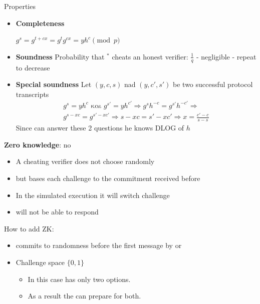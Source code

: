 \documentclass[handout]{beamer}
\begin{document}
\begin{frame}[allowframebreaks]{Properties}

\begin{itemize}
\item \textbf{Completeness}
    \begin{center}
    $g^s = g^{t+cx} = g^t g^{cx} = yh^c \pmod{p}$
    \end{center}

\item \textbf{Soundness} 
Probability that \prv$^*$ cheats an honest verifier: $\frac{1}{q}$ - negligible - repeat to decrease
\pause
\item \textbf{Special soundness}
Let $(y,c,s)$ nad  $(y,c',s')$ be two successful protocol transcripts
\pause
\begin{align*}
 g^s = yh^c  \text{ και }  g^{s'} = yh^{c'}  \Rightarrow  g^s h^{-c}   = g^{s'} h^{-c'}  \Rightarrow \\
 g^{s-xc} = g^{s'-xc'} \Rightarrow  s-xc = s'-xc' \Rightarrow  
 x = \frac{c'-c}{s-s}
\end{align*}
\pause
Since \prv can answer these 2 questions he knows DLOG of $h$
\end{itemize}

\framebreak

\textbf{Zero knowledge}: \alert{no}
 
\begin{itemize}
\item A cheating verifier does not choose randomly  \pause
\item but bases each challenge to the commitment received before \siml \pause
\item In the simulated execution it will switch challenge \pause
\item \siml will not be able to respond \pause
\end{itemize}

How to add ZK: \pause

\begin{itemize}
\item \ver commits to randomness before the first message by  \prv or \pause
\item Challenge space $\{ 0 , 1 \} $ 
\begin{itemize}
\item In this case \ver has only two options. 
\item As a result the \siml can prepare for both.
\end{itemize} 
\end{itemize} 


\end{frame}
\end{document}
